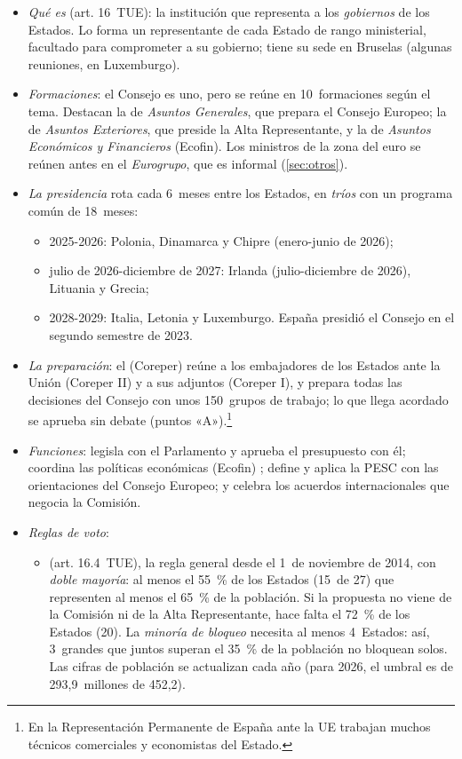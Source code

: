 \documentclass[11pt]{article}
\begin{document}
\begin{itemize}
\item \emph{Qué es} (art. 16~TUE): la institución que representa a los \emph{gobiernos} de los Estados. Lo forma un representante de cada Estado de rango ministerial, facultado para comprometer a su gobierno; tiene su sede en Bruselas (algunas reuniones, en Luxemburgo).
\item \emph{Formaciones}: el Consejo es uno, pero se reúne en 10~formaciones según el tema. Destacan la de \emph{Asuntos Generales}, que prepara el Consejo Europeo; la de \emph{Asuntos Exteriores}, que preside la Alta Representante, y la de \emph{Asuntos Económicos y Financieros} (Ecofin). Los ministros de la zona del euro se reúnen antes en el \emph{Eurogrupo}, que es informal (\ref{sec:otros}).
\item \emph{La presidencia} rota cada 6~meses entre los Estados, en \emph{tríos} con un programa común de 18~meses\nocite{Consejo2026Presidencias}:
  \begin{itemize}
  \item 2025-2026: Polonia, Dinamarca y Chipre (enero-junio de 2026);
  \item julio de 2026-diciembre de 2027: Irlanda (julio-diciembre de 2026), Lituania y Grecia;
  \item 2028-2029: Italia, Letonia y Luxemburgo. España presidió el Consejo en el segundo semestre de 2023.
  \end{itemize}
\item \emph{La preparación}: el  (Coreper) reúne a los embajadores de los Estados ante la Unión (Coreper II) y a sus adjuntos (Coreper I), y prepara todas las decisiones del Consejo con unos 150~grupos de trabajo; lo que llega acordado se aprueba sin debate (puntos «A»).\footnote{En la Representación Permanente de España ante la UE trabajan muchos técnicos comerciales y economistas del Estado.}
\item \emph{Funciones}: legisla con el Parlamento y aprueba el presupuesto con él; coordina las políticas económicas (Ecofin) ; define y aplica la PESC con las orientaciones del Consejo Europeo; y celebra los acuerdos internacionales que negocia la Comisión.
\item \emph{Reglas de voto}:
  \begin{itemize}
  \item {} (art. 16.4~TUE), la regla general desde el 1~de noviembre de 2014, con \emph{doble mayoría}: al menos el 55~\% de los Estados (15~de 27) que representen al menos el 65~\% de la población. Si la propuesta no viene de la Comisión ni de la Alta Representante, hace falta el 72~\% de los Estados (20). La \emph{minoría de bloqueo} necesita al menos 4~Estados: así, 3~grandes que juntos superan el 35~\% de la población no bloquean solos\nocite{Consejo2026Votacion}. Las cifras de población se actualizan cada año (para 2026, el umbral es de 293,9~millones de 452,2)\nocite{Consejo2025Poblacion}.

\end{itemize}
\end{itemize}
\end{document}
